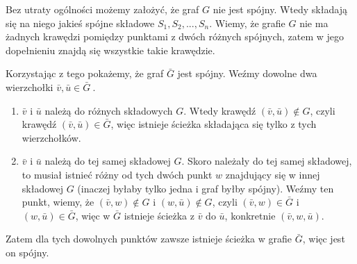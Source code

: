 \documentclass[12pt,a4paper]{article}
\begin{document}
Bez utraty ogólności możemy założyć, że graf \(G\) nie jest spójny. Wtedy składają się na niego jakieś spójne składowe \(S_1, S_2, ..., S_n \). Wiemy, że grafie \( G \) nie ma żadnych krawędzi pomiędzy punktami z dwóch różnych spójnych, zatem w jego dopełnieniu znajdą się wszystkie takie krawędzie.

Korzystając z tego pokażemy, że graf \( \bar{G} \) jest spójny. Weźmy dowolne dwa wierzchołki \( \bar{v}, \bar{u} \in \bar{G} \ \).
\begin{enumerate}
	\item \( \bar{v} \) i \(\bar{u} \) należą do różnych składowych \( G\). Wtedy krawędź \( (\bar{v},\bar{u})\notin G \), czyli krawędź \( (\bar{v},\bar{u}) \in \bar{G} \), więc istnieje ścieżka składająca się tylko z tych wierzchołków.
	\item \( \bar{v} \) i \(\bar{u} \) należą do tej samej składowej \( G \). Skoro należały do tej samej składowej, to musiał istnieć różny od tych dwóch punkt \( w \) znajdujący się w innej składowej \( G\) (inaczej byłaby tylko jedna i graf byłby spójny). Weźmy ten punkt, wiemy, że \( (\bar{v},w)\notin G \) i \( (w,\bar{u})\notin G \), czyli \( (\bar{v},w)\in \bar{G} \) i \( (w,\bar{u})\in \bar{G} \), więc w \(\bar{G}\) istnieje ścieżka z \( \bar{v} \) do \(\bar{u} \), konkretnie \( (\bar{v}, w, \bar{u}) \).
\end{enumerate}
Zatem dla tych dowolnych punktów zawsze istnieje ścieżka w grafie \( \bar{G} \), więc jest on spójny.
\end{document}
